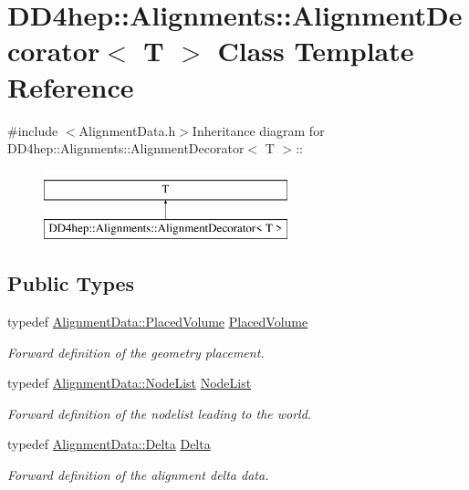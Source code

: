 \hypertarget{class_d_d4hep_1_1_alignments_1_1_alignment_decorator}{
\section{DD4hep::Alignments::AlignmentDecorator$<$ T $>$ Class Template Reference}
\label{class_d_d4hep_1_1_alignments_1_1_alignment_decorator}
}


{\ttfamily \#include $<$AlignmentData.h$>$}Inheritance diagram for DD4hep::Alignments::AlignmentDecorator$<$ T $>$::\begin{figure}[H]
\begin{center}
\leavevmode
\includegraphics[height=2cm]{class_d_d4hep_1_1_alignments_1_1_alignment_decorator}
\end{center}
\end{figure}
\subsection*{Public Types}
\begin{DoxyCompactItemize}
\item 
typedef \hyperlink{class_d_d4hep_1_1_geometry_1_1_placed_volume}{AlignmentData::PlacedVolume} \hyperlink{class_d_d4hep_1_1_alignments_1_1_alignment_decorator_a3dc9016a6686627ec2e6584aed9c8eeb}{PlacedVolume}
\begin{DoxyCompactList}\small\item\em Forward definition of the geometry placement. \item\end{DoxyCompactList}\item 
typedef \hyperlink{class_d_d4hep_1_1_alignments_1_1_alignment_data_a3a667fd798d7523d75accee832d64521}{AlignmentData::NodeList} \hyperlink{class_d_d4hep_1_1_alignments_1_1_alignment_decorator_aedab1bae256b0583734ed4325c58a7a7}{NodeList}
\begin{DoxyCompactList}\small\item\em Forward definition of the nodelist leading to the world. \item\end{DoxyCompactList}\item 
typedef \hyperlink{class_d_d4hep_1_1_alignments_1_1_delta}{AlignmentData::Delta} \hyperlink{class_d_d4hep_1_1_alignments_1_1_alignment_decorator_aafa729192cc27e7d36f6e9cfd3484289}{Delta}
\begin{DoxyCompactList}\small\item\em Forward definition of the alignment delta data. \item\end{DoxyCompactList}\end{DoxyCompactItemize}
